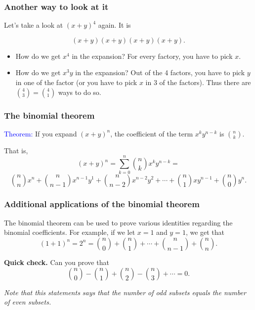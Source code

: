 \begin{frame}\frametitle{Another way to look at it}
  Let's take a look at $(x+y)^4$ again.  It is

  \[ (x+y)(x+y)(x+y)(x+y). \]

  \begin{itemize}
  \item How do we get $x^4$ in the expansion?  \pause For every
    factory, you have to pick $x$.
  \item How do we get $x^3y$ in the expansion? \pause Out of the 4
    factors, you have to pick $y$ in one of the factor (or you have to
    pick $x$ in 3 of the factors).  \pause Thus there are
    $\binom{4}{3}=\binom{4}{1}$ ways to do so.
  \end{itemize}
\end{frame}

\begin{frame}\frametitle{The binomial theorem}
  \begin{tcolorbox}
    \textcolor{blue}{Theorem:} If you expand $(x+y)^n$, the
    coefficient of the term $x^ky^{n-k}$ is $\binom{n}{k}$.
  \end{tcolorbox}
  That is,
  \[ (x+y)^n = \sum_{k=0}^n \binom{n}{k} x^ky^{n-k} = \]
  \[ \binom{n}{n} x^n + \binom{n}{n-1} x^{n-1}y^1 + \binom{n}{n-2} x^{n-2}y^2 + \cdots + \binom{n}{1}xy^{n-1} + \binom{n}{0} y^n.\]
\end{frame}

\begin{frame}\frametitle{Additional applications of the binomial theorem}
  The binomial theorem can be used to prove various identities
  regarding the binomial coefficients.  For example, if we let $x=1$
  and $y=1$, we get that
  \[(1+1)^n=2^n=\binom{n}{0}+\binom{n}{1}+\cdots+\binom{n}{n-1}+\binom{n}{n}.\]

  \pause

  \vspace{0.2in}

  \begin{tcolorbox}
    {\bf Quick check.}  Can you prove that
    \[\binom{n}{0} - \binom{n}{1} + \binom{n}{2} - \binom{n}{3} + \cdots = 0.\]

    {\em Note that this statements says that the number of odd subsets
      equals the number of even subsets.}
  \end{tcolorbox}
\end{frame}
